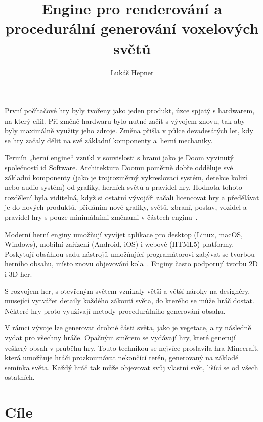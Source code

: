\documentclass[thesis=M,czech]{FITthesis}[2019/12/23]
\title{Engine pro renderování a procedurální generování voxelových světů}
\author{Lukáš Hepner} %
\begin{document}

\begin{introduction}
První počítačové hry byly tvořeny jako jeden produkt, úzce spjatý s hardwarem, na který cílil. Při změně hardwaru bylo nutné začít s vývojem znovu, tak aby byly maximálně využity jeho zdroje. Změna přišla v půlce devadesátých let, kdy se hry začaly dělit na své základní komponenty a~herní mechaniky.

Termín „herní engine“ vznikl v souvislosti s hrami jako je Doom vyvinutý společností id Software. Architektura Doomu poměrně dobře odděluje své základní komponenty (jako je trojrozměrný vykreslovací systém, detekce kolizí nebo audio systém) od grafiky, herních světů a pravidel hry. Hodnota tohoto rozdělení byla viditelná, když si ostatní vývojáři začali licencovat hry a předělávat je do nových produktů, přidáním nové grafiky, světů, zbraní, postav, vozidel a pravidel hry s pouze minimálními změnami v částech enginu~\cite{gea_11}.

Moderní herní enginy umožňují vyvíjet aplikace pro desktop (Linux, \mbox{macOS}, Windows), mobilní zařízení (Android, iOS) i webové (HTML5) platformy. Poskytují obsáhlou sadu nástrojů umožňující programátorovi zabývat se tvorbou herního obsahu, místo znovu objevování kola~\cite{godot_intro}. Enginy často podporují tvorbu 2D i 3D her.

S rozvojem her, s otevřeným světem vznikaly větší a větší nároky na designéry, musející vytvářet detaily každého zákoutí světa, do kterého se může hráč dostat. Některé hry proto využívají metody procedurálního generování obsahu.

V rámci vývoje lze generovat drobné části světa, jako je vegetace, a ty následně vydat pro všechny hráče. Opačným směrem se vydávají hry, které generují veškerý obsah v průběhu hry. Touto technikou se nejvíce proslavila hra Minecraft, která umožňuje hráči prozkoumávat nekončící terén, generovaný na základě semínka světa. Každý hráč tak může objevovat svůj vlastní svět, lišící se od všech ostatních. 

\end{introduction}

\chapter{Cíle}
\end{document}
